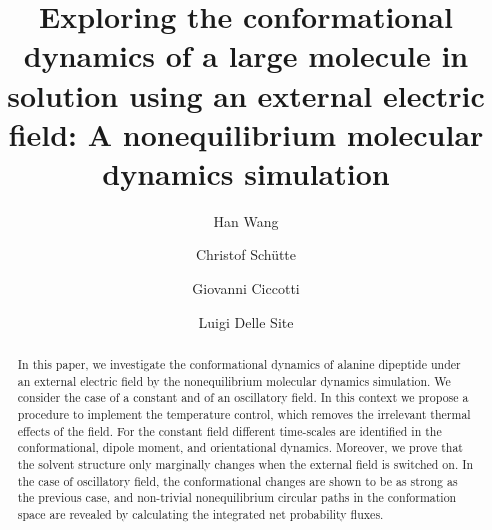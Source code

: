\documentclass[a4paper,preprint,unsortedaddress,onecolumn]{revtex4-1}
\begin{document}
\title{Exploring the conformational dynamics of a large molecule in solution using an external electric field: A nonequilibrium molecular dynamics simulation}
\author{Han Wang}
\author{Christof Sch\"utte}
\author{Giovanni Ciccotti}
\author{Luigi Delle Site}
   
\begin{abstract}
In this paper, we investigate the conformational dynamics of alanine
   dipeptide under an external electric field by the
   nonequilibrium molecular dynamics simulation.  We consider
   the case of a constant and of an oscillatory field. In this context we
propose a procedure to
   implement the temperature control, which removes the irrelevant thermal
effects of the field. For the constant field different time-scales are
   identified  in the conformational, dipole moment, and orientational
   dynamics. Moreover, we prove that the solvent structure only
   marginally changes when the external field is switched on.  In the
   case of oscillatory field, the conformational changes are shown to be as
   strong as the previous case, and non-trivial nonequilibrium
   circular paths in the conformation space are revealed by calculating the
   integrated net probability fluxes.
\end{abstract}
\end{document}
